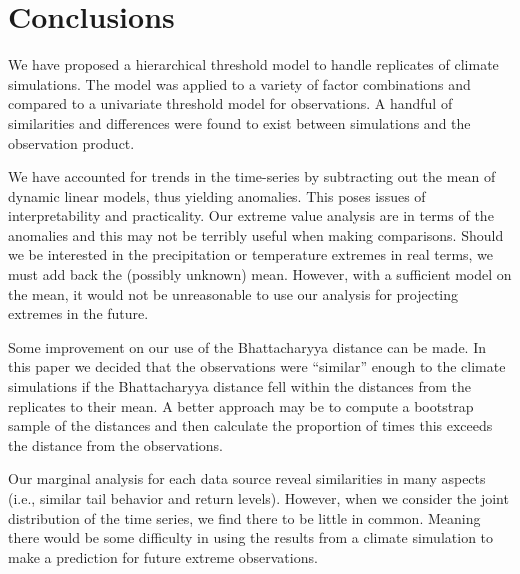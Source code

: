 \section{Conclusions}
\label{conclusions}

We have proposed a hierarchical threshold model to handle replicates of climate simulations. The model was applied to a variety of factor combinations and compared to a univariate threshold model for observations. A handful of similarities and differences were found to exist between simulations and the observation product.

We have accounted for trends in the time-series by subtracting out the mean of dynamic linear models, thus yielding anomalies. This poses issues of interpretability and practicality. Our extreme value analysis are in terms of the anomalies and this may not be terribly useful when making comparisons. Should we be interested in the precipitation or temperature extremes in real terms, we must add back the (possibly unknown) mean. However, with a sufficient model on the mean, it would not be unreasonable to use our analysis for projecting extremes in the future.

Some improvement on our use of the Bhattacharyya distance can be made. In this paper we decided that the observations were ``similar'' enough to the climate simulations if the Bhattacharyya distance fell within the distances from the replicates to their mean. A better approach may be to compute a bootstrap sample of the distances and then calculate the proportion of times this exceeds the distance from the observations. 

Our marginal analysis for each data source reveal similarities in many aspects (i.e., similar tail behavior and return levels). However, when we consider the joint distribution of the time series, we find there to be little in common. Meaning there would be some difficulty in using the results from a climate simulation to make a prediction for future extreme observations.

